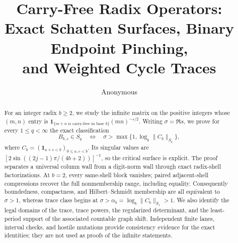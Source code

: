 \documentclass[11pt,a4paper]{article}
\title{\textbf{Carry-Free Radix Operators:}\\
Exact Schatten Surfaces, Binary Endpoint Pinching,\\
and Weighted Cycle Traces}
\author{Anonymous}
\date{}
\begin{document}
\maketitle

\begin{abstract}
For an integer radix \(b\ge2\), we study the infinite matrix on the positive
integers whose \((m,n)\) entry is
\(\mathbf 1_{\{m+n\text{ is carry-free in base }b\}}(mn)^{-s/2}\).
Writing \(\sigma=\Re s\), we prove for every \(1\le q<\infty\) the exact
classification
\[
  B_{b,s}\in S_q
  \quad\Longleftrightarrow\quad
  \sigma>\max\{1,\log_b\|C_b\|_{S_q}\},
\]
where \(C_b=(\mathbf 1_{a+c<b})_{0\le a,c<b}\).  Its singular values are
\([2\sin((2j-1)\pi/(4b+2))]^{-1}\), so the critical surface is explicit.
The proof separates a universal column wall from a digit-norm wall through
exact radix-shell factorizations.  At \(b=2\), every same-shell block
vanishes; paired adjacent-shell compressions recover the full
nonmembership range, including equality.  Consequently boundedness,
compactness, and Hilbert--Schmidt membership are all equivalent to
\(\sigma>1\), whereas trace class begins at
\(\sigma>\alpha_b=\log_b\|C_b\|_{S_1}>1\).  We also identify the legal
domains of the trace, trace powers, the regularized determinant, and the
least-period support of the associated countable graph shift.  Independent
finite lanes, interval checks, and hostile mutations provide consistency
evidence for the exact identities; they are not used as proofs of the
infinite statements.
\end{abstract}










\appendix







\end{document}
